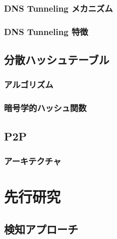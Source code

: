 \documentclass[12pt]{jarticle} %
\begin{document}
\subsubsection{DNS Tunneling メカニズム}
\subsubsection{DNS Tunneling 特徴}
\subsection{分散ハッシュテーブル}
\subsubsection{アルゴリズム}
\subsubsection{暗号学的ハッシュ関数}
\subsection{P2P}
\subsubsection{アーキテクチャ}


\newpage
\section{先行研究}
\subsection{検知アプローチ}
\end{document}
